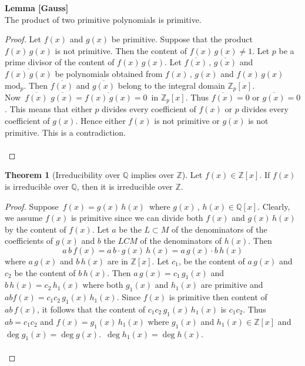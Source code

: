 \documentclass[11pt,a4paper]{article}
\theoremstyle{definition}
\newtheorem{thm}{Theorem}[subsection]
\begin{document}
\textbf{Lemma [Gauss]}\\
The product of two primitive polynomials is primitive.\\

\begin{proof}
Let $f(x)$ and $g(x)$ be primitive. Suppose that the product $f(x)\,g(x)$ is not primitive. Then the content of $f(x)\, g(x) \neq 1$. Let $p$ be a prime divisor of the content of $f(x)\, g(x)$. Let $\overline{f(x)}\, , \, \overline{g(x)}$ and  $\overline{f(x)\, g(x)}$ be polynomials obtained from $f(x)\, , \, g(x)$ and $f(x)\, g(x)$ mod$_p$. Then $\overline{f(x)}$ and $\overline{g(x)}$ belong to the integral domain $\mathbb{Z}_p[x]$.\\
Now $\, \overline{f(x)}\, \,\overline{g(x)}  = \overline{f(x)\, g(x)} = 0\,$ in $\mathbb{Z}_p[x]$. Thus $\overline{f(x)} = 0$ or $\overline{g(x)} = 0$. This means that either $p$ divides every coefficient of $f(x)$ or $p$ divides every coefficient of $g(x)$. Hence either $f(x)$ is not primitive or $g(x)$ is not primitive. This is a contradiction.\\\\
\end{proof}





\begin{thm}[Irreducibility over $\mathbb{Q}$ implies over $\mathbb{Z}$]
Let $f(x)\in \mathbb{Z}[x]$. If $f(x)$ is irreducible over $\mathbb{Q}$, then it is irreducible over $\mathbb{Z}$.\\
\end{thm}

\begin{proof}
Suppose $\, f(x) = g(x)\, h(x)\,$ where $g(x)\, , \, h(x)\in \mathbb{Q}[x]$. Clearly, we assume $f(x)$ is primitive since we can divide both $f(x)$ and $g(x)\, h(x)$ by the content of $f(x)$. Let  $a$ be the $L\subset M$ of the denominators of the coefficients of $g(x)$ and $b$ the $LCM$ of the denominators of $h(x)$. Then
$$a\, b\, f(x) = a\, b \cdot g(x)\, h(x) = a\, g(x) \cdot b\, h(x)$$
where $a\, g(x)$ and $b\, h(x)$ are in $\mathbb{Z}[x]$. Let $c_1$, be the content of $a\, g(x)$ and $c_2$ be the content of $b\, h(x)$. Then $a\, g(x) = c_1\, g_1(x)$ and $b\, h(x) = c_2\, h_1(x)$ where both $g_1(x)$ and $h_1(x)$ are primitive and  $a b f(x) = c_1 c_2\, g_1(x)\, h_1(x)$. Since $f(x)$ is primitive then content of $ab\, f(x)$, it follows that the content of  $c_1 c_2\, g_1(x)\, h_1(x)$ is $c_1 c_2$. Thus $a b = c_1 c_2$ and $f(x) = g_1(x)\, h_1(x)$ where $g_1(x)$ and $h_1(x)\in \mathbb{Z}[x]$ and $\deg g_1(x) = \deg g(x)$. $\, \deg h_1(x) = \deg h(x)$.\\\\
\end{proof}
\end{document}
